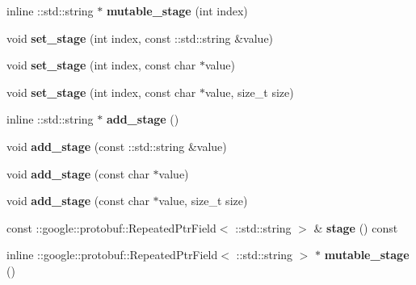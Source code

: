 \begin{DoxyCompactItemize}
\item 
\mbox{\label{classcaffe_1_1_net_state_ad9c818c6badcad8d42950098be15a0c5}} 
inline \+::std\+::string $\ast$ {\bfseries mutable\+\_\+stage} (int index)
\item 
\mbox{\label{classcaffe_1_1_net_state_a5d044d31e26926191f83519ed6ac7d41}} 
void {\bfseries set\+\_\+stage} (int index, const \+::std\+::string \&value)
\item 
\mbox{\label{classcaffe_1_1_net_state_a92da4c280b7ca824405b89b09c706412}} 
void {\bfseries set\+\_\+stage} (int index, const char $\ast$value)
\item 
\mbox{\label{classcaffe_1_1_net_state_aca08b0549be884360c5fccd49175e24c}} 
void {\bfseries set\+\_\+stage} (int index, const char $\ast$value, size\+\_\+t size)
\item 
\mbox{\label{classcaffe_1_1_net_state_a0ad1051970a035840f59f8da81cd73e3}} 
inline \+::std\+::string $\ast$ {\bfseries add\+\_\+stage} ()
\item 
\mbox{\label{classcaffe_1_1_net_state_a52a8ff6dbfc2164598459ea2cb9880b1}} 
void {\bfseries add\+\_\+stage} (const \+::std\+::string \&value)
\item 
\mbox{\label{classcaffe_1_1_net_state_adc069473ed0a1f5f570bac84ea41291f}} 
void {\bfseries add\+\_\+stage} (const char $\ast$value)
\item 
\mbox{\label{classcaffe_1_1_net_state_a90d55428350f0811e534a01f0eb22ca2}} 
void {\bfseries add\+\_\+stage} (const char $\ast$value, size\+\_\+t size)
\item 
\mbox{\label{classcaffe_1_1_net_state_afacc08607e40e9aff345702970222826}} 
const \+::google\+::protobuf\+::\+Repeated\+Ptr\+Field$<$ \+::std\+::string $>$ \& {\bfseries stage} () const
\item 
\mbox{\label{classcaffe_1_1_net_state_a839d9991dfbadf62c0ea0f68bd2e157b}} 
inline \+::google\+::protobuf\+::\+Repeated\+Ptr\+Field$<$ \+::std\+::string $>$ $\ast$ {\bfseries mutable\+\_\+stage} ()
\end{DoxyCompactItemize}
